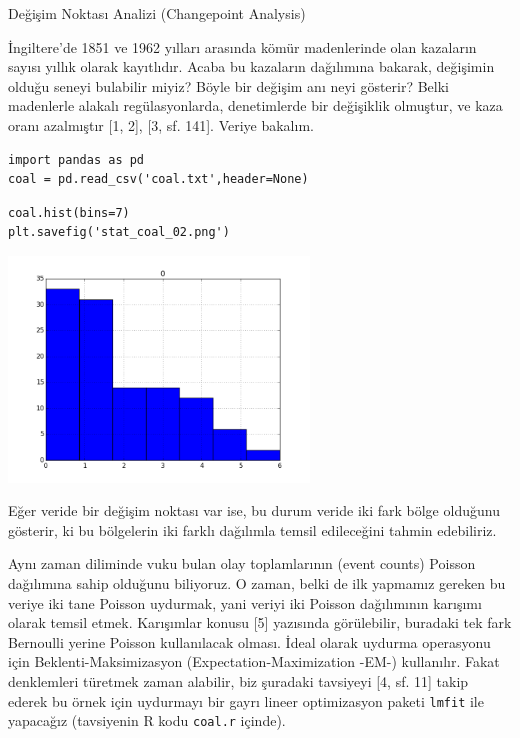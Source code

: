\documentclass[12pt,fleqn]{article}\usepackage{../../common}
\begin{document}
Değişim Noktası Analizi (Changepoint Analysis)

İngiltere'de 1851 ve 1962 yılları arasında kömür madenlerinde olan
kazaların sayısı yıllık olarak kayıtlıdır. Acaba bu kazaların dağılımına
bakarak, değişimin olduğu seneyi bulabilir miyiz? Böyle bir değişim anı
neyi gösterir? Belki madenlerle alakalı regülasyonlarda, denetimlerde bir
değişiklik olmuştur, ve kaza oranı azalmıştır [1, 2], [3, sf. 141]. Veriye
bakalım.

\begin{verbatim}
import pandas as pd
coal = pd.read_csv('coal.txt',header=None)
\end{verbatim}

\begin{verbatim}
coal.hist(bins=7)
plt.savefig('stat_coal_02.png')
\end{verbatim}

\includegraphics[height=6cm]{stat_coal_02.png}

Eğer veride bir değişim noktası var ise, bu durum veride iki fark bölge
olduğunu gösterir, ki bu bölgelerin iki farklı dağılımla temsil edileceğini
tahmin edebiliriz. 

Aynı zaman diliminde vuku bulan olay toplamlarının (event counts) Poisson
dağılımına sahip olduğunu biliyoruz. O zaman, belki de ilk yapmamız gereken
bu veriye iki tane Poisson uydurmak, yani veriyi iki Poisson dağılımının
karışımı olarak temsil etmek. Karışımlar konusu [5] yazısında görülebilir,
buradaki tek fark Bernoulli yerine Poisson kullanılacak olması. İdeal
olarak uydurma operasyonu için Beklenti-Maksimizasyon
(Expectation-Maximization -EM-) kullanılır. Fakat denklemleri türetmek
zaman alabilir, biz şuradaki tavsiyeyi [4, sf. 11] takip ederek bu örnek
için uydurmayı bir gayrı lineer optimizasyon paketi \verb!lmfit! ile
yapacağız (tavsiyenin R kodu \verb!coal.r! içinde).
\end{document}
